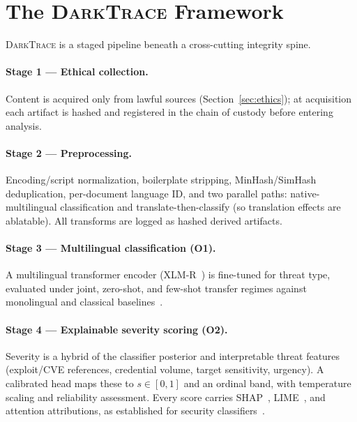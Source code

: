 \documentclass[11pt,a4paper]{article}
\newcommand{\framework}{\textsc{DarkTrace}}
\begin{document}
\section{The \framework{} Framework}\label{sec:framework}

\framework{} is a staged pipeline beneath a cross-cutting integrity spine.

\paragraph{Stage 1 --- Ethical collection.} Content is acquired only from lawful sources
(Section~\ref{sec:ethics}); at acquisition each artifact is hashed and registered in the
chain of custody before entering analysis.

\paragraph{Stage 2 --- Preprocessing.} Encoding/script normalization, boilerplate
stripping, MinHash/SimHash deduplication, per-document language ID, and two parallel
paths: native-multilingual classification and translate-then-classify (so translation
effects are ablatable). All transforms are logged as hashed derived artifacts.

\paragraph{Stage 3 --- Multilingual classification (O1).} A multilingual transformer
encoder (XLM-R~\cite{conneau2020xlmr,vaswani2017attention}) is fine-tuned for threat type,
evaluated under joint, zero-shot, and few-shot transfer regimes against monolingual and
classical baselines~\cite{thangaraj2024crosslingual,alharbi2025bert}.

\paragraph{Stage 4 --- Explainable severity scoring (O2).} Severity is a hybrid of the
classifier posterior and interpretable threat features (exploit/CVE references, credential
volume, target sensitivity, urgency). A calibrated head maps these to $s\in[0,1]$ and an
ordinal band, with temperature scaling and reliability assessment. Every score carries
SHAP~\cite{lundberg2017shap}, LIME~\cite{ribeiro2016lime}, and attention attributions, as
established for security classifiers~\cite{hermosilla2025xai,gaspar2024xai,salih2023perspective}.
\end{document}

